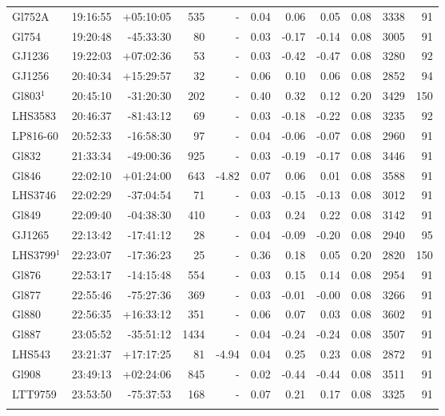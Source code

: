 \documentclass{aa}
\begin{document}
{\begin{longtable}{l r r r r r r r r r r}
Gl752A & 19:16:55 & +05:10:05 & 535 &    - & 0.04 & 0.06 & 0.05 & 0.08 & 3338 &   91 \\
Gl754 & 19:20:48 & -45:33:30 & 80 &    - & 0.03 & -0.17 & -0.14 & 0.08 & 3005 &   91 \\
GJ1236 & 19:22:03 & +07:02:36 & 53 &    - & 0.03 & -0.42 & -0.47 & 0.08 & 3280 &   92 \\
GJ1256 & 20:40:34 & +15:29:57 & 32 &    - & 0.06 & 0.10 & 0.06 & 0.08 & 2852 &   94 \\
Gl803$^1$ & 20:45:10 & -31:20:30 & 202 &    - & 0.40 & 0.32 & 0.12 & 0.20 & 3429 &  150 \\
LHS3583 & 20:46:37 & -81:43:12 & 69 &    - & 0.03 & -0.18 & -0.22 & 0.08 & 3235 &   92 \\
LP816-60 & 20:52:33 & -16:58:30 & 97 &    - & 0.04 & -0.06 & -0.07 & 0.08 & 2960 &   91 \\
Gl832 & 21:33:34 & -49:00:36 & 925 &    - & 0.03 & -0.19 & -0.17 & 0.08 & 3446 &   91 \\
Gl846 & 22:02:10 & +01:24:00 & 643 & -4.82 & 0.07 & 0.06 & 0.01 & 0.08 & 3588 &   91 \\
LHS3746 & 22:02:29 & -37:04:54 & 71 &    - & 0.03 & -0.15 & -0.13 & 0.08 & 3012 &   91 \\
Gl849 & 22:09:40 & -04:38:30 & 410 &    - & 0.03 & 0.24 & 0.22 & 0.08 & 3142 &   91 \\
GJ1265 & 22:13:42 & -17:41:12 & 28 &    - & 0.04 & -0.09 & -0.20 & 0.08 & 2940 &   95 \\
LHS3799$^1$ & 22:23:07 & -17:36:23 & 25 &    - & 0.36 & 0.18 & 0.05 & 0.20 & 2820 &  150 \\
Gl876 & 22:53:17 & -14:15:48 & 554 &    - & 0.03 & 0.15 & 0.14 & 0.08 & 2954 &   91 \\
Gl877 & 22:55:46 & -75:27:36 & 369 &    - & 0.03 & -0.01 & -0.00 & 0.08 & 3266 &   91 \\
Gl880 & 22:56:35 & +16:33:12 & 351 &    - & 0.06 & 0.07 & 0.03 & 0.08 & 3602 &   91 \\
Gl887 & 23:05:52 & -35:51:12 & 1434 &    - & 0.04 & -0.24 & -0.24 & 0.08 & 3507 &   91 \\
LHS543 & 23:21:37 & +17:17:25 & 81 & -4.94 & 0.04 & 0.25 & 0.23 & 0.08 & 2872 &   91 \\
Gl908 & 23:49:13 & +02:24:06 & 845 &    - & 0.02 & -0.44 & -0.44 & 0.08 & 3511 &   91 \\
LTT9759 & 23:53:50 & -75:37:53 & 168 &    - & 0.07 & 0.21 & 0.17 & 0.08 & 3325 &   91 \\
\label{table:full}
\end{longtable}

}
\end{document}
